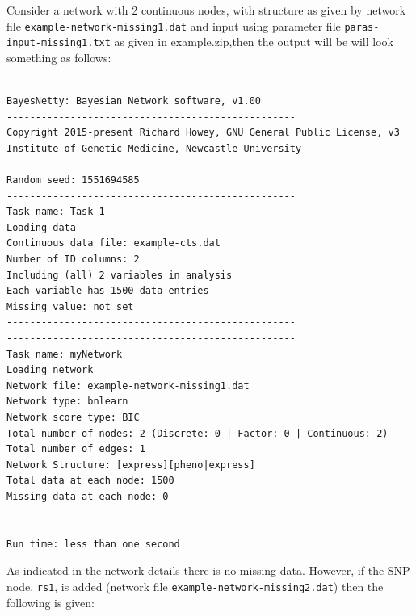 \documentclass[a4paper,12pt]{article}
\newcommand{\code}[1]{{\footnotesize{{\tt #1}}}}
\begin{document}
Consider a network with 2 continuous nodes, with structure as given by network file \code{example-network-missing1.dat} and input using parameter file \code{paras-input-missing1.txt} as given in example.zip,then the output will be will look something as follows: 
\vspace{0.35cm} \begin{lstlisting}

BayesNetty: Bayesian Network software, v1.00
--------------------------------------------------
Copyright 2015-present Richard Howey, GNU General Public License, v3
Institute of Genetic Medicine, Newcastle University

Random seed: 1551694585
--------------------------------------------------
Task name: Task-1
Loading data
Continuous data file: example-cts.dat
Number of ID columns: 2
Including (all) 2 variables in analysis
Each variable has 1500 data entries
Missing value: not set
--------------------------------------------------
--------------------------------------------------
Task name: myNetwork
Loading network
Network file: example-network-missing1.dat
Network type: bnlearn
Network score type: BIC
Total number of nodes: 2 (Discrete: 0 | Factor: 0 | Continuous: 2)
Total number of edges: 1
Network Structure: [express][pheno|express]
Total data at each node: 1500
Missing data at each node: 0
--------------------------------------------------

Run time: less than one second

\end{lstlisting} \vspace{0.35cm}
As indicated in the network details there is no missing data. However, if the SNP node, \code{rs1}, is added (network file \code{example-network-missing2.dat}) then the following is given: 
\end{document}
